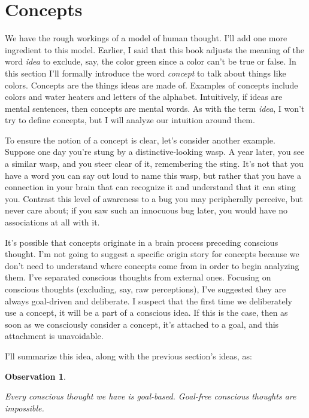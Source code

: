 \documentclass[9pt, twoside]{book}
\newtheorem{obs}{Observation}
\theoremstyle{argtstyle}
\begin{document}
\section{Concepts}\label{s_mental_words}

We have the rough workings of a model of human thought.
I'll add one more
ingredient to this model.
Earlier, I said that this book adjusts the meaning of the word
{\em idea} to exclude, say, the color green since a color
can't be true or false.
In this section I'll formally introduce the word {\em concept} to talk about
things like colors.
Concepts are
the things ideas are made of.
Examples of concepts include
colors and water heaters and letters of the alphabet.
Intuitively, if
ideas are mental sentences, then
concepts are mental words.
As with the term {\em idea}, I won't try to define concepts,
but I will analyze our intuition around them.

To ensure the notion of a concept is clear, let's consider another example.
Suppose one day you're stung
by a distinctive-looking wasp.
A year later, you see a similar wasp, and you
steer clear of it, remembering the sting.
It's not that you have a word you can say out loud to name this wasp,
but rather that you have a connection in your brain that can recognize it and
understand that it can sting you.
Contrast this level of awareness to a bug you may peripherally perceive, but
never care about; if you saw such an innocuous bug later, you would have no
associations at all with it.

It's possible that concepts originate in a brain process preceding conscious
thought.
I'm not going to suggest a specific origin story for concepts
because we don't need to understand where concepts come from
in order to begin analyzing them.
I've separated conscious thoughts from external ones.
Focusing on conscious thoughts (excluding, say, raw perceptions),
I've suggested they are always goal-driven and deliberate.
I suspect that
the first time we deliberately use a concept, it will be a
part of a conscious idea.
If this is the case, then
as soon as we consciously consider a concept, it's attached
to a goal, and this attachment is unavoidable.


I'll summarize this idea, along with the previous section's ideas, as:
\newcommand{\obsfour}{
    Every conscious thought we have is goal-based.
    Goal-free conscious %
    thoughts are impossible.
}
\begin{obs}\label{o4}
    \obsfour
\end{obs}
\end{document}
